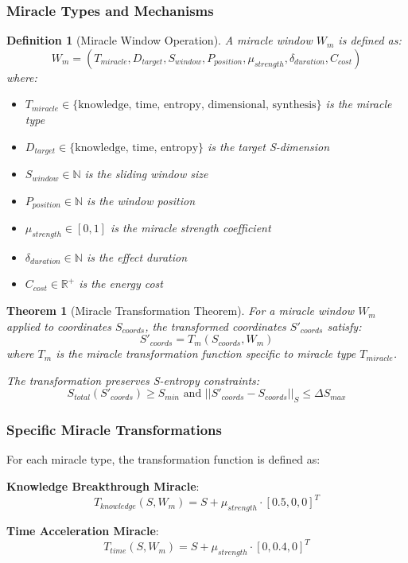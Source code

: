 \documentclass[12pt,a4paper]{article}
\newtheorem{theorem}{Theorem}
\newtheorem{definition}{Definition}
\begin{document}
\subsubsection{Miracle Types and Mechanisms}

\begin{definition}[Miracle Window Operation]
A miracle window $W_m$ is defined as:
$$W_m = (T_{miracle}, D_{target}, S_{window}, P_{position}, \mu_{strength}, \delta_{duration}, C_{cost})$$
where:
\begin{itemize}
\item $T_{miracle} \in \{\text{knowledge, time, entropy, dimensional, synthesis}\}$ is the miracle type
\item $D_{target} \in \{\text{knowledge, time, entropy}\}$ is the target S-dimension
\item $S_{window} \in \mathbb{N}$ is the sliding window size
\item $P_{position} \in \mathbb{N}$ is the window position
\item $\mu_{strength} \in [0,1]$ is the miracle strength coefficient
\item $\delta_{duration} \in \mathbb{N}$ is the effect duration
\item $C_{cost} \in \mathbb{R}^+$ is the energy cost
\end{itemize}
\end{definition}

\begin{theorem}[Miracle Transformation Theorem]
For a miracle window $W_m$ applied to coordinates $S_{coords}$, the transformed coordinates $S'_{coords}$ satisfy:
$$S'_{coords} = T_m(S_{coords}, W_m)$$
where $T_m$ is the miracle transformation function specific to miracle type $T_{miracle}$.

The transformation preserves S-entropy constraints:
$$S_{total}(S'_{coords}) \geq S_{min} \text{ and } ||S'_{coords} - S_{coords}||_S \leq \Delta S_{max}$$
\end{theorem}

\subsubsection{Specific Miracle Transformations}

For each miracle type, the transformation function is defined as:

\textbf{Knowledge Breakthrough Miracle}:
$$T_{knowledge}(S, W_m) = S + \mu_{strength} \cdot [0.5, 0, 0]^T$$

\textbf{Time Acceleration Miracle}:
$$T_{time}(S, W_m) = S + \mu_{strength} \cdot [0, 0.4, 0]^T$$
\end{document}
